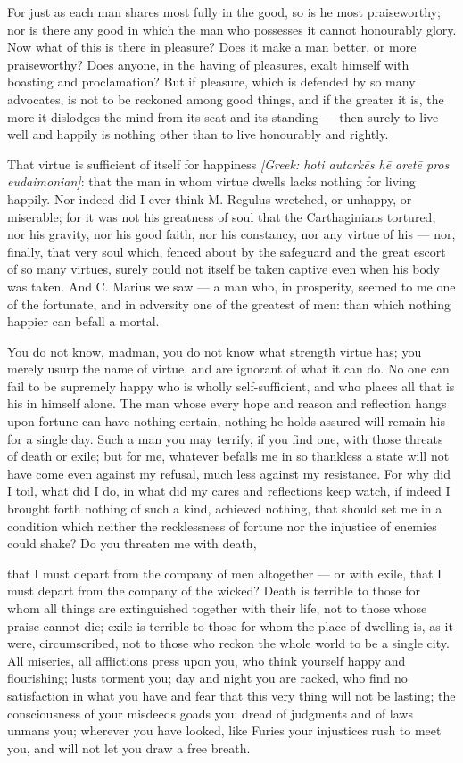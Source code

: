  For just as each man shares most fully in the good, so is he most praiseworthy; nor is there any good in which the man who possesses it cannot honourably glory. Now what of this is there in pleasure? Does it make a man better, or more praiseworthy? Does anyone, in the having of pleasures, exalt himself with boasting and proclamation? But if pleasure, which is defended by so many advocates, is not to be reckoned among good things, and if the greater it is, the more it dislodges the mind from its seat and its standing — then surely to live well and happily is nothing other than to live honourably and rightly.

 That virtue is sufficient of itself for happiness \textit{[Greek: hoti autarkēs hē aretē pros eudaimonian]}: that the man in whom virtue dwells lacks nothing for living happily. Nor indeed did I ever think M. Regulus wretched, or unhappy, or miserable; for it was not his greatness of soul that the Carthaginians tortured, nor his gravity, nor his good faith, nor his constancy, nor any virtue of his — nor, finally, that very soul which, fenced about by the safeguard and the great escort of so many virtues, surely could not itself be taken captive even when his body was taken. And C. Marius we saw — a man who, in prosperity, seemed to me one of the fortunate, and in adversity one of the greatest of men: than which nothing happier can befall a mortal.

 You do not know, madman, you do not know what strength virtue has; you merely usurp the name of virtue, and are ignorant of what it can do. No one can fail to be supremely happy who is wholly self-sufficient, and who places all that is his in himself alone. The man whose every hope and reason and reflection hangs upon fortune can have nothing certain, nothing he holds assured will remain his for a single day. Such a man you may terrify, if you find one, with those threats of death or exile; but for me, whatever befalls me in so thankless a state will not have come even against my refusal, much less against my resistance. For why did I toil, what did I do, in what did my cares and reflections keep watch, if indeed I brought forth nothing of such a kind, achieved nothing, that should set me in a condition which neither the recklessness of fortune nor the injustice of enemies could shake? Do you threaten me with death,

 that I must depart from the company of men altogether — or with exile, that I must depart from the company of the wicked? Death is terrible to those for whom all things are extinguished together with their life, not to those whose praise cannot die; exile is terrible to those for whom the place of dwelling is, as it were, circumscribed, not to those who reckon the whole world to be a single city. All miseries, all afflictions press upon you, who think yourself happy and flourishing; lusts torment you; day and night you are racked, who find no satisfaction in what you have and fear that this very thing will not be lasting; the consciousness of your misdeeds goads you; dread of judgments and of laws unmans you; wherever you have looked, like Furies your injustices rush to meet you, and will not let you draw a free breath.

